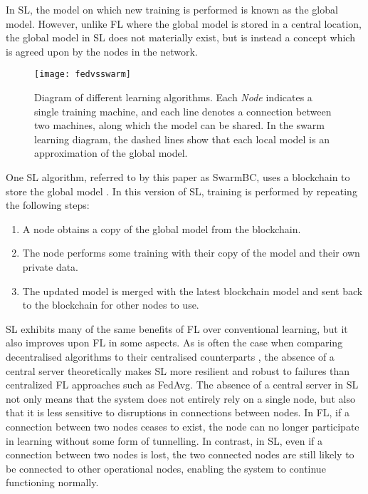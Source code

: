 In SL, the model on which new training is performed is known as the global model. However, unlike FL where the global model is stored in a central location, the global model in SL does not materially exist, but is instead a concept which is agreed upon by the nodes in the network.

\begin{figure}[h]
	\texttt{[image: fedvsswarm]}
	\caption{Diagram of different learning algorithms. Each \emph{Node} indicates a single training machine, and each line denotes a connection between two machines, along which the model can be shared. In the swarm learning diagram, the dashed lines show that each local model is an approximation of the global model.} \label{fig_learning}
\end{figure}

One SL algorithm, referred to by this paper as SwarmBC, uses a blockchain to store the global model \cite{swarm_learning}. In this version of SL, training is performed by repeating the following steps:
\begin{enumerate}
	\item A node obtains a copy of the global model from the blockchain.
	\item The node performs some training with their copy of the model and their own private data.
	\item The updated model is merged with the latest blockchain model and sent back to the blockchain for other nodes to use.
\end{enumerate}

SL exhibits many of the same benefits of FL over conventional learning, but it also improves upon FL in some aspects. As is often the case when comparing decentralised algorithms to their centralised counterparts \cite{swarm_resil}, the absence of a central server theoretically makes SL more resilient and robust to failures than centralized FL approaches such as FedAvg. The absence of a central server in SL not only means that the system does not entirely rely on a single node, but also that it is less sensitive to disruptions in connections between nodes. In FL, if a connection between two nodes ceases to exist, the node can no longer participate in learning without some form of tunnelling. In contrast, in SL, even if a connection between two nodes is lost, the two connected nodes are still likely to be connected to other operational nodes, enabling the system to continue functioning normally.

